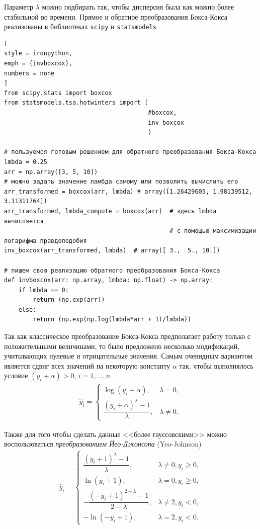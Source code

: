 \documentclass[%
	11pt,
	a4paper,
	utf8,
		]{article}
\begin{document}
Параметр $ \lambda $ можно подбирать так, чтобы дисперсия была как можно более стабильной во времени. Прямое и обратное преобразования Бокса-Кокса реализованы в библиотеках \texttt{scipy} и \texttt{statsmodels}
\begin{lstlisting}[
style = ironpython,
emph = {invboxcox},
numbers = none
]
from scipy.stats import boxcox
from statsmodels.tsa.hotwinters import (
                                        #boxcox,
                                        inv_boxcox
                                        )

# пользуемся готовым решением для обратного преобразования Бокса-Кокса
lmbda = 0.25
arr = np.array([3, 5, 10])
# можно задать значение ламбда самому или позволить вычислить его
arr_transformed = boxcox(arr, lmbda) # array([1.26429605, 1.98139512, 3.11311764])
arr_transformed, lmbda_compute = boxcox(arr)  # здесь lmbda вычисляется
                                              # с помощью максимизации логарифма правдоподобия
inv_boxcox(arr_transformed, lmbda)  # array([ 3.,  5., 10.])

# пишем свою реализацию обратного преобразования Бокса-Кокса
def invboxcox(arr: np.array, lmbda: np.float) -> np.array:
    if lmbda == 0:
        return (np.exp(arr))
    else:
        return (np.exp(np.log(lmbda*arr + 1)/lmbda))
\end{lstlisting}

Так как классическое преобразование Бокса-Кокса предполагает работу только с положительными величинами, то было предложено несколько модификаций, учитывающих нулевые и отрицательные значения. Самым очевидным вариантом является сдвиг всех значений на некоторую константу $ \alpha $ так, чтобы выполнялось условие $ (y_i + \alpha) > 0, \, i = 1,\dots, n $
\begin{align*}
	\hat{y}_i =
	\begin{cases}
		\log (y_i + \alpha), &\lambda = 0,\\
		\dfrac{(y_i + \alpha)^\lambda - 1}{\lambda}, &\lambda \neq 0.
	\end{cases}
\end{align*}

Также для того чтобы сделать данные <<более гауссовскими>> можно воспользоваться \emph{преобразованием Йео-Джонсона} (Yeo-Johnson)
\begin{align*}
	\hat{y}_i = 
	\begin{cases}
		\dfrac{(y_i + 1)^\lambda - 1}{\lambda}, &\lambda \neq 0, y_i \geqslant 0,\\
		\ln(y_i + 1), &\lambda = 0, y_i \geqslant 0,\\
		- \dfrac{(-y_i + 1)^{2 - \lambda} - 1}{2 - \lambda}, &\lambda \neq 2, y_i < 0,\\
		-\ln(-y_i + 1), &\lambda = 2, y_i < 0.
	\end{cases}
\end{align*}
\end{document}
